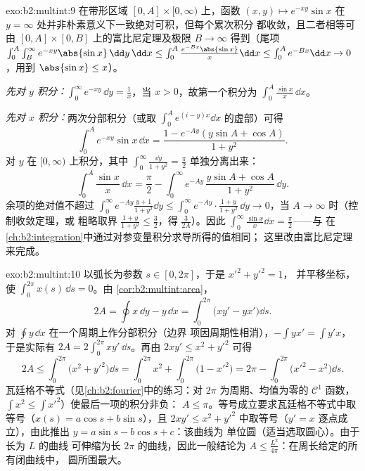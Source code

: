 \begin{solution}{exo:b2:multint:9}
在带形区域 $[0, A] \times [0, \infty)$ 上，函数 $(x, y)
\mapsto e^{-xy}\sin x$ 在 $y =
\infty$ 处并非朴素意义下一致绝对可积，但每个累次积分
都收敛，且二者相等可由 $[0, A]
\times [0, B]$ 上的富比尼定理及极限 $B \to \infty$ 得到（尾项
$\int_0^A\int_B^\infty e^{-xy}\abs{\sin x}\,\dd y\,\dd x \leq
\int_0^A \frac{e^{-Bx}\abs{\sin x}}{x}\dd x \leq \int_0^A e^{-Bx}
\dd x\to 0$，用到 $\abs{\sin x} \leq x$）。

\emph{先对 $y$ 积分：}$\int_0^\infty e^{-xy}\,\dd y = \frac1x$，当 $x
> 0$，故第一个积分为 $\int_0^A \frac{\sin x}{x}\,\dd x$。

\emph{先对 $x$ 积分：}两次分部积分（或取
$\int_0^A e^{(i - y)x}\dd x$ 的虚部）可得
\[
\int_0^A e^{-xy}\sin x\,\dd x
= \frac{1 - e^{-Ay}(y\sin A + \cos A)}{1 + y^2} .
\]
对 $y$ 在 $[0, \infty)$ 上积分，其中 $\int_0^\infty
\frac{\dd y}{1 + y^2} = \frac\pi2$ 单独分离出来：
\[
\int_0^A \frac{\sin x}{x}\,\dd x
= \frac{\pi}{2}
- \int_0^\infty e^{-Ay}\,\frac{y\sin A + \cos A}{1 + y^2}\,\dd y .
\]
余项的绝对值不超过 $\int_0^\infty e^{-Ay}\frac{y +
1}{1 + y^2}\dd y \leq \int_0^\infty e^{-Ay}\cdot\frac{1+y}{1+y^2}
\,\dd y \to 0$，当 $A \to \infty$ 时（控制收敛定理，或
粗略取界 $\frac{1 + y}{1 + y^2} \leq \frac32$，得
$\frac{3}{2A}$）。因此 $\int_0^\infty\frac{\sin x}{x}\dd x =
\frac\pi2$——与
在\cref{ch:b2:integration}中通过对参变量积分求导所得的值相同；
这里改由富比尼定理来完成。
\end{solution}

\begin{solution}{exo:b2:multint:10}
以弧长为参数 $s \in [0, 2\pi]$，于是 $x'^2 + y'^2 = 1$，
并平移坐标，使 $\int_0^{2\pi} x(s)\,\dd s = 0$。由
\cref{cor:b2:multint:area}，
\[
2A = \oint x\,\dd y - y\,\dd x
= \int_0^{2\pi}\bigl(xy' - yx'\bigr)\dd s .
\]
对 $\oint y\,\dd x$ 在一个周期上作分部积分（边界
项因周期性相消），$-\int yx' = \int y'x$，于是实际有
$2A = 2\int_0^{2\pi}xy'\,\dd s$。再由 $2xy' \leq x^2 + y'^2$
可得
\[
2A \leq \int_0^{2\pi}\bigl(x^2 + y'^2\bigr)\dd s
= \int_0^{2\pi} x^2 + \int_0^{2\pi}\bigl(1 - x'^2\bigr)
= 2\pi - \int_0^{2\pi}\bigl(x'^2 - x^2\bigr)\dd s .
\]
瓦廷格不等式（见\cref{ch:b2:fourier}中的练习：对
$2\pi$ 为周期、均值为零的 $\mathcal{C}^1$ 函数，
$\int x^2 \leq \int x'^2$）使最后一项的积分非负：
$A \leq \pi$。等号成立要求瓦廷格不等式中取等号（$x(s) =
a\cos s + b\sin s$），且 $2xy' \leq x^2 + y'^2$ 中取等号（$y' = x$
逐点成立），由此推出 $y = a\sin s - b\cos s + c$：该曲线为
单位圆（适当选取圆心）。由于长为 $L$ 的曲线
可伸缩为长 $2\pi$ 的曲线，因此一般结论为 $A \leq
\frac{L^2}{4\pi}$：在周长给定的所有闭曲线中，
圆所围最大。
\end{solution}

